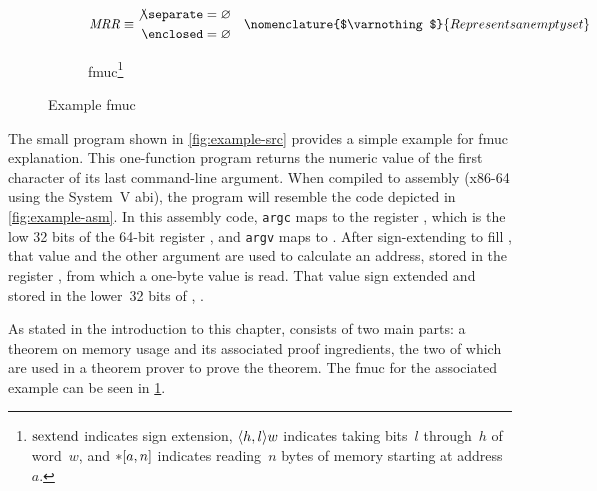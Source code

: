 \begin{figure*}
\begin{subfigure}{\linewidth}
\begin{subequations}
\begin{align}
        \var{MRR} &\equiv\begin{aligned}
          \not\separate &= \varnothing \\
          \enclosed &= \varnothing
        \end{aligned} \notag
      \end{align}%
      \nomenclature{$\varnothing$}{Represents an empty set}
    \end{subequations}
    \caption{\Acl*{fmuc}\footnote{%
      $\operatorname{sextend}$ indicates sign extension,
      $\langle h,l\rangle w$ indicates taking bits~$l$ through~$h$ of word~$w$,
      and $\ast[a,n]$ indicates reading~$n$ bytes of memory
      starting at address~$a$.
    }}\label{fig:fmuc-thm}
  \end{subfigure}
  \caption{Example \acl*{fmuc}}\label{fig:fmuc}
\end{figure*}

The small program shown in \cref{fig:example-src} provides a simple example
for \ac{fmuc} explanation. This one-function program
returns the numeric value of the first character of its last command-line argument.
When compiled to assembly (x86-64 using the System~V \ac{abi}),
the program will resemble the code depicted in \cref{fig:example-asm}.
In this assembly code,
\lstinline|argc| maps to the register ,
which is the low 32 bits of the 64-bit register ,
and \lstinline|argv| maps to .
After sign-extending  to fill ,
that value and the other argument are used to calculate
an address, stored in the register ,
from which a one-byte value is read.
That value sign extended and stored in the lower~32 bits of ,
.

As stated in the introduction to this chapter,  consists of two main parts:
a theorem on memory usage and its associated proof ingredients,%
%
the two of which are used in a theorem prover to prove the theorem.
The \ac{fmuc} for the associated example can be seen in \cref{fig:fmuc-thm}.

